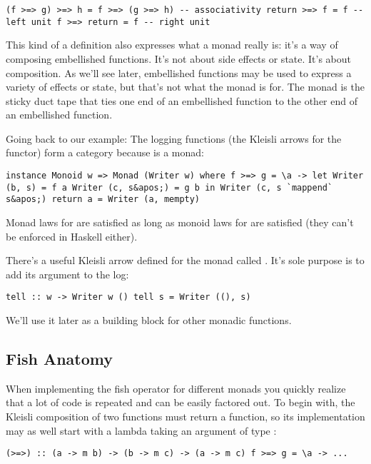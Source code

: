 \begin{verbatim}
(f >=> g) >=> h = f >=> (g >=> h) -- associativity return >=> f = f -- left unit f >=> return = f -- right unit
\end{verbatim}

This kind of a definition also expresses what a monad really is: it's a
way of composing embellished functions. It's not about side effects or
state. It's about composition. As we'll see later, embellished functions
may be used to express a variety of effects or state, but that's not
what the monad is for. The monad is the sticky duct tape that ties one
end of an embellished function to the other end of an embellished
function.

Going back to our  example: The logging functions (the
Kleisli arrows for the  functor) form a category because
 is a monad:

\begin{verbatim}
instance Monoid w => Monad (Writer w) where f >=> g = \a -> let Writer (b, s) = f a Writer (c, s&apos;) = g b in Writer (c, s `mappend` s&apos;) return a = Writer (a, mempty)
\end{verbatim}

Monad laws for  are satisfied as long as monoid laws
for  are satisfied (they can't be enforced in Haskell either).

There's a useful Kleisli arrow defined for the  monad
called . It's sole purpose is to add its argument to the
log:

\begin{verbatim}
tell :: w -> Writer w () tell s = Writer ((), s)
\end{verbatim}

We'll use it later as a building block for other monadic functions.

\subsection{Fish Anatomy}\label{fish-anatomy}

When implementing the fish operator for different monads you quickly
realize that a lot of code is repeated and can be easily factored out.
To begin with, the Kleisli composition of two functions must return a
function, so its implementation may as well start with a lambda taking
an argument of type :

\begin{verbatim}
(>=>) :: (a -> m b) -> (b -> m c) -> (a -> m c) f >=> g = \a -> ...
\end{verbatim}


